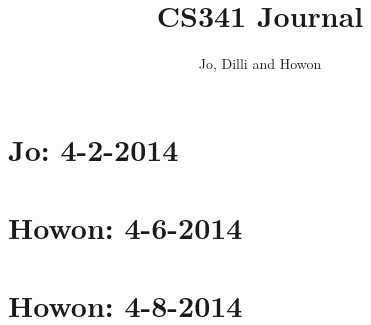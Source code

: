 


\author{Jo, Dilli and Howon}\title{CS341 Journal}\maketitle

\section*{Jo: 4-2-2014}


\section*{Howon: 4-6-2014}


\section*{Howon: 4-8-2014}



